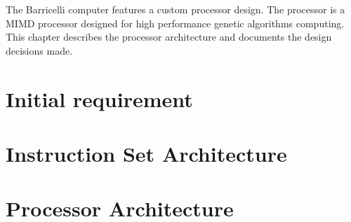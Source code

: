 The Barricelli computer features a custom processor design.
The processor is a MIMD processor designed for high performance genetic algorithms computing.
This chapter describes the processor architecture and documents the design decisions made.

\section {Initial requirement}
     \label{fpga:section:initial_requirements}

\section{Instruction Set Architecture} \label{fpga:isa:s:isa}
    

\section {Processor Architecture}
     \label{fpga:section:cpu_architecture}
